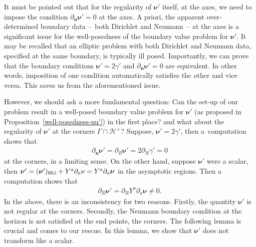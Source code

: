 \documentclass[pdftex]{sigma}
\def\ptl{\partial}%
\def\mbo#1{\boldsymbol{#1}}%
\numberwithin{equation}{section}
\begin{document}
It must be pointed out that for the regularity of $\mbo{\nu'}$ itself, at the axes, we need to impose the condition $\ptl_{\mbo{n}} \mbo{\nu}'=0$ at the axes. A priori, the apparent over-determined boundary data --~both Dirichlet and Neumann~-- at the axes is a significant issue for the well-posedness of the boundary value problem for $\mbo{\nu}'$. It may be recalled that an elliptic problem with both Dirichlet and Neumann data, specified at the same boundary, is typically ill posed. Importantly, we can prove that the boundary conditions $\mbo{\nu}' = 2 \gamma'$ and $\ptl_{\mbo{n}} \mbo{\nu}'=0$ are equivalent. In other words, imposition of one condition automatically satisfies the other and vice versa. This saves us from the aforementioned issue.

However, we should ask a more fundamental question: Can the set-up of our problem result in a well-posed boundary value problem for $\mbo{\nu}'$ (as proposed in Proposition~\ref{well-posedness-nu'}) in the first place? and what about the regularity of $\mbo{\nu}'$ at the corners $\Gamma \cap \mathcal{H}^+$?
Suppose, $\mbo{\nu}' = 2 \gamma'$, then a~computation shows that
\begin{align*}
\ptl_{\mbo{n}} \mbo{\nu}' = \ptl_R \mbo{\nu}'= 2 \ptl_R \gamma' =0
\end{align*}
at the corners, in a limiting sense. On the other hand, suppose $\mbo{\nu}'$ were a scalar, then $\mbo{\nu}' = (\mbo{\nu}')_{{\rm HG}} + Y^a \ptl_a \nu = Y^a \ptl_a \mbo{\nu}$ in the asymptotic regions. Then a computation shows that
\begin{align*}
\ptl_R \mbo{\nu}' = \ptl_R Y^a \ptl_a \mbo{\nu} \neq 0.
\end{align*}
In the above, there is an inconsistency for two reasons. Firstly, the quantity $\mbo{\nu}'$ is not regular at the corners. Secondly, the Neumann boundary condition at the horizon is not satisfied at the end points, the corners. The following lemma is crucial and comes to our rescue. In this lemma, we show that $\mbo{\nu}'$ does not transform like a scalar.
\end{document}
